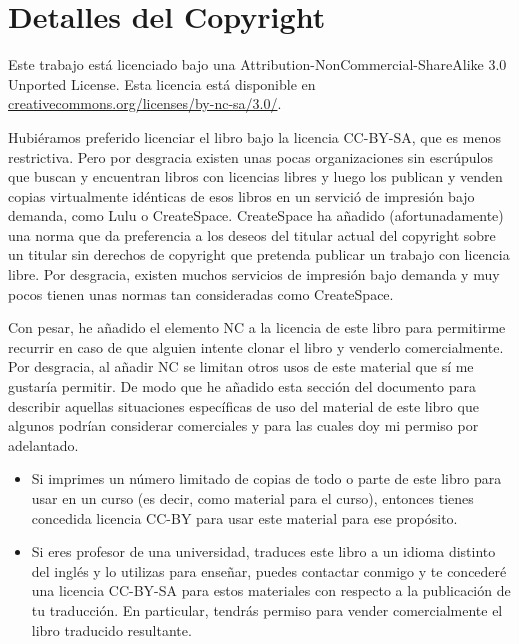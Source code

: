 
\chapter{Detalles del Copyright}

Este trabajo está licenciado bajo una
Attribution-NonCommercial-ShareAlike 3.0 Unported License.
Esta licencia está
disponible en
\url{creativecommons.org/licenses/by-nc-sa/3.0/}.  

Hubiéramos preferido licenciar el libro bajo la licencia
CC-BY-SA, que es menos restrictiva. Pero por desgracia existen
unas pocas organizaciones sin escrúpulos
que buscan y encuentran libros con licencias libres
y luego los publican y venden copias virtualmente idénticas de esos libros
en un servició de impresión bajo demanda, como Lulu o CreateSpace. CreateSpace
ha añadido (afortunadamente) una norma que da preferencia a los deseos del titular
actual del copyright sobre un titular sin derechos de copyright que pretenda
publicar un trabajo con licencia libre. Por desgracia, existen muchos
servicios de impresión bajo demanda y muy pocos tienen unas normas tan
consideradas como CreateSpace.

Con pesar, he añadido el elemento NC a la licencia
de este libro para permitirme recurrir en caso de que alguien intente clonar el
libro y venderlo comercialmente. Por desgracia, al añadir NC se limitan otros
usos de este material que sí me gustaría permitir. De modo que he añadido esta
sección del documento para describir aquellas situaciones específicas
de uso del material de este libro que algunos podrían considerar comerciales
y para las cuales doy mi permiso por adelantado.

\begin{itemize}
\item Si imprimes un número limitado de copias de todo o parte de
este libro para usar en un curso (es decir, como material para el curso),
entonces tienes concedida licencia CC-BY para usar este material para ese propósito.

\item Si eres profesor de una universidad, traduces este libro
a un idioma distinto del inglés y lo utilizas para enseñar, puedes
contactar conmigo y te concederé una licencia CC-BY-SA
para estos materiales con respecto a la publicación de tu traducción.
En particular, tendrás permiso para
vender comercialmente el libro traducido resultante.
\end{itemize}

